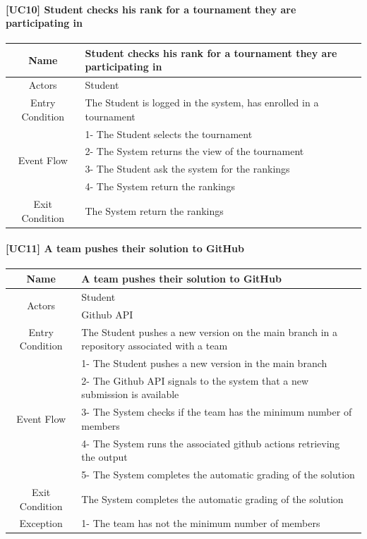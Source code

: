 \documentclass{article}
\begin{document}
\paragraph{[UC10] Student checks his rank for a tournament they are participating in}
\begin{center}
\begin{tabular}{|c|m{40em}|}
\hline
Name & Student checks his rank for a tournament they are participating in\\
\hline
\multirow{1}{4em}{Actors}
& Student\\
\hline
Entry Condition & The Student is logged in the system, has enrolled in a tournament\\
\hline
\multirow{4}{4em}{Event Flow}
& 1- The Student selects the tournament\\
& 2- The System returns the view of the tournament\\
& 3- The Student ask the system for the rankings\\
& 4- The System return the rankings\\
\hline
Exit Condition & The System return the rankings\\
\hline
\end{tabular}
\end{center}

\paragraph{[UC11] A team pushes their solution to GitHub}
\begin{center}
\begin{tabular}{|c|m{40em}|}
\hline
Name & A team pushes their solution to GitHub\\
\hline
\multirow{2}{4em}{Actors}
& Student\\
& Github API\\
\hline
Entry Condition & The Student pushes a new version on the main branch in a repository associated with a team\\
\hline
\multirow{5}{4em}{Event Flow}
& 1- The Student pushes a new version in the main branch\\
& 2- The Github API signals to the system that a new submission is available\\
& 3- The System checks if the team has the minimum number of members\\
& 4- The System runs the associated github actions retrieving the output\\
& 5- The System completes the automatic grading of the solution\\
\hline
Exit Condition & The System completes the automatic grading of the solution\\
\hline
Exception & 1- The team has not the minimum number of members\\
\hline
\end{tabular}
\end{center}
\end{document}
